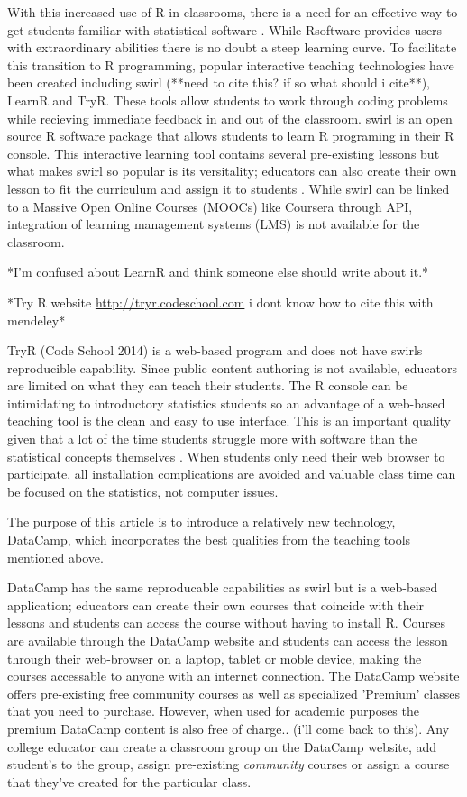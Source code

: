 \documentclass[12pt]{article}
\begin{document}
With this increased use of R in classrooms, there is a need for an effective way to get students familiar with statistical software
\cite{Baumer2014}. While Rsoftware provides users with extraordinary abilities there is no doubt a steep learning curve. To facilitate
this transition to R programming, popular interactive teaching technologies have been created including swirl (**need to cite this?
if so what should i cite**), LearnR and TryR. 
These tools allow students to work through coding problems while recieving immediate feedback in and out of the classroom. swirl is an
open source R software package that allows students to learn R programing in their R console. This interactive learning tool
contains several pre-existing lessons but what makes swirl so popular is its versitality; educators can also create their own
lesson to fit the curriculum and assign it to students \cite{Carchedi2014}.
While swirl can be linked to a Massive Open Online Courses (MOOCs) like Coursera through API, integration of learning management 
systems (LMS) is not available for the classroom. 

*I'm confused about LearnR and think someone else should write about it.*


*Try R website  \url{http://tryr.codeschool.com} i dont know how to cite this with mendeley*

TryR (Code School 2014) is a web-based program and does not have swirls reproducible capability. Since public content authoring
is not available, educators are limited on what they can teach their students. The R console can be intimidating to
introductory statistics students so an advantage of a web-based teaching tool is
the clean and easy to use interface. This is an important quality given that a lot of the time students struggle more with
software than the statistical concepts themselves \cite{Hare2017}. When students only need their web browser to participate,
all installation complications are avoided and valuable class time can be focused on the statistics, not computer issues.

The purpose of this article is to introduce a relatively new technology, DataCamp, which incorporates the best
qualities from the teaching tools mentioned above.

DataCamp has the same reproducable capabilities as swirl but is a web-based application; educators can
create their own courses that coincide with their lessons and students can access the course without having to install R.
Courses are available through the DataCamp website and students can access the lesson through their web-browser on a laptop,
tablet or moble device, making the courses accessable to anyone with an internet connection. 
The DataCamp website offers pre-existing free community courses as well as specialized 'Premium' classes that you need to purchase. 
However, when used for academic purposes the premium DataCamp content is also free of charge.. (i'll come back to this).
Any college educator can create a classroom group on the DataCamp website, add student's to the group, assign pre-existing 
\textit{community} courses or assign a course that they've created for the particular class. 
\end{document}

